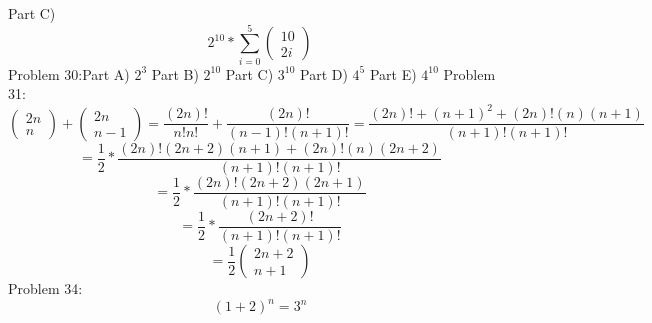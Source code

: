 \documentclass{article}
\begin{document}
	Part C)
	$$
	2^{10}
	*
	\sum_{i=0}^{5}
	\left(\begin{array}{c}
	10\\
	2i
	\end{array}\right)
	$$
	Problem 30:Part A)
	$2^3$
	\newline
	Part B)
	$2^{10}$
	\newline
	Part C)
	$3^{10}$
	\newline
	Part D)
	$4^5$
	\newline
	Part E)
	$4^{10}$
	\newline
	Problem 31:
	$$
	\left(\begin{array}{c}
	2n\\
	n
	\end{array}\right)
	+
	\left(\begin{array}{c}
	2n\\
	n-1
	\end{array}\right)
	=
	\frac{(2n)!}{n!n!}
	+
	\frac{(2n)!}{(n-1)!(n+1)!}
	=
	\frac{(2n)!+(n+1)^2+(2n)!(n)(n+1)}{(n+1)!(n+1)!}
	$$
	$$
	=
	\frac{1}{2}
	*
	\frac{(2n)!(2n+2)(n+1)+(2n)!(n)(2n+2)}{(n+1)!(n+1)!}
	$$
	$$
	=
	\frac{1}{2}
	*
	\frac{(2n)!(2n+2)(2n+1)}{(n+1)!(n+1)!}
	$$
	$$
	=
	\frac{1}{2}
	*
	\frac{(2n+2)!}{(n+1)!(n+1)!}
	$$
	$$
	=
	\frac{1}{2}
	\left(\begin{array}{c}
	2n+2\\
	n+1
	\end{array}\right)
	$$
	Problem 34:
	$$
	(1+2)^{n}=3^n
	$$	
\end{document}
